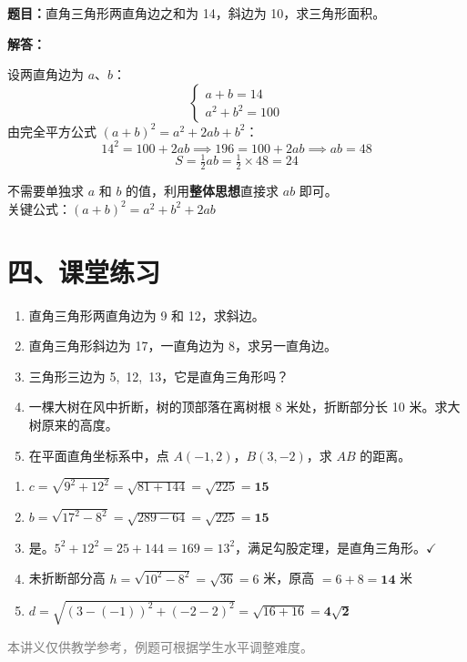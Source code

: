 \documentclass[12pt, a4paper]{ctexart}
\begin{document}
\begin{appbox}[【应用4】面积与勾股定理]
\textbf{题目：}直角三角形两直角边之和为 14，斜边为 10，求三角形面积。

\vspace{6pt}
\textbf{解答：}

设两直角边为 $a$、$b$：
\[
\begin{cases} a + b = 14 \\ a^2 + b^2 = 100 \end{cases}
\]
由完全平方公式 $(a+b)^2 = a^2 + 2ab + b^2$：
\[
14^2 = 100 + 2ab \implies 196 = 100 + 2ab \implies ab = 48
\]
\[
S = \tfrac{1}{2}ab = \tfrac{1}{2} \times 48 = \boxed{24}
\]
\end{appbox}

\begin{tipbox}[技巧点拨]
不需要单独求 $a$ 和 $b$ 的值，利用\textbf{整体思想}直接求 $ab$ 即可。\\
关键公式：$(a+b)^2 = a^2 + b^2 + 2ab$
\end{tipbox}

\section*{\textcolor{tipgreen}{四、课堂练习}}

\begin{enumerate}[leftmargin=2em, itemsep=8pt]
  \item 直角三角形两直角边为 9 和 12，求斜边。
  \item 直角三角形斜边为 17，一直角边为 8，求另一直角边。
  \item 三角形三边为 5,\ 12,\ 13，它是直角三角形吗？
  \item 一棵大树在风中折断，树的顶部落在离树根 8 米处，折断部分长 10 米。求大树原来的高度。
  \item 在平面直角坐标系中，点 $A(-1,2)$，$B(3,-2)$，求 $AB$ 的距离。
\end{enumerate}

\vspace{10pt}
\begin{knowledgebox}[参考答案]
\begin{enumerate}[leftmargin=2em, itemsep=4pt]
  \item $c = \sqrt{9^2+12^2} = \sqrt{81+144} = \sqrt{225} = \mathbf{15}$
  \item $b = \sqrt{17^2-8^2} = \sqrt{289-64} = \sqrt{225} = \mathbf{15}$
  \item 是。$5^2+12^2=25+144=169=13^2$，满足勾股定理，是直角三角形。\quad $\checkmark$
  \item 未折断部分高 $h = \sqrt{10^2-8^2} = \sqrt{36} = 6$ 米，原高 $= 6+8 = \mathbf{14}$ 米
  \item $d = \sqrt{(3-(-1))^2+(-2-2)^2} = \sqrt{16+16} = \mathbf{4\sqrt{2}}$
\end{enumerate}
\end{knowledgebox}

\vfill
\begin{center}
\small\textcolor{gray}{本讲义仅供教学参考，例题可根据学生水平调整难度。}
\end{center}
\end{document}
